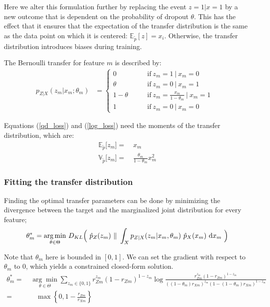 \documentclass[twoside,11pt]{article}
\begin{document}
Here we alter this formulation further by replacing the event $z=1|x=1$ by a new outcome that is dependent on the probability of dropout $\theta$. This has the effect that it ensures that the expectation of the transfer distribution is the same as the data point on which it is centered: $\mathbb{E}_{\tilde{p}}[z] = x_{i}$. Otherwise, the transfer distribution introduces biases during training.

The Bernoulli transfer for feature $m$ is described by:
\begin{align}
p_{Z|X}(z_m|x_m;\theta_m) &= \begin{cases}
0 \quad & \text{if} \ z_m=1 \ | \ x_m=0\\
\theta \quad & \text{if} \ z_m=0 \ | \ x_m=1\\
1-\theta \quad \quad  &\text{if} \ z_m=\frac{x_m}{1-\theta_m} \ | \ x_m=1\\
1 \quad & \text{if} \ z_m=0 \ | \ x_m=0
\end{cases} &
\end{align}

Equations (\ref{qd_loss}) and (\ref{log_loss}) need the moments of the transfer distribution, which are:
\begin{align}
\mathbb{E}_{\tilde{p}}\big[z_m \big] =& \ x_m \label{Eblank} \\
\mathbb{V}_{\tilde{p}}\big[z_m \big] =& \ \frac{\theta_m}{1-\theta_m} x_m^{2} \label{Vblank}
\end{align}

\subsubsection{Fitting the transfer distribution}
Finding the optimal transfer parameters can be done by minimizing the divergence between the target and the marginalized joint distribution for every feature; 
\begin{align}
	{\bf \theta}_{m}^{*} = \underset{\theta \in \Theta}{\arg \min} \ D_{KL}\Big( \ \hat{p}_{Z}(z_m) \ \|\ \int_{X} p_{Z|X}(z_m|x_m, \theta_m) \ \hat{p}_{X}(x_m) \ \mathrm{d}x_m \ \Big) \nonumber
\end{align}

Note that $\theta_m$ here is bounded in $[0,1]$. We can set the gradient with respect to $\theta_m$ to 0, which yields a constrained closed-form solution.
\begin{align}
	\theta_{m}^{*} =& \ \underset{\theta \in \Theta}{\arg \min} \sum_{z_{m}\in\{0,1\}}  r_{Zm}^{z_m}(1-r_{Zm})^{1-z_m} \log \frac{r_{Zm}^{z_m}(1-r_{Zm})^{1-z_m}}{((1-\theta_m)r_{Xm})^{z_m}(1-(1-\theta_m)r_{Xm})^{1-z_m}} & \nonumber \\
	=& \quad \max \left\{0, 1-\frac{r_{Zm}}{r_{Xm}} \label{theta_star} \right\}
\end{align}
\end{document}
